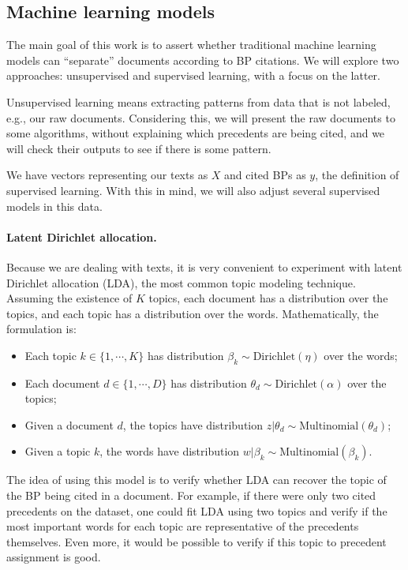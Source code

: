 \subsection{Machine learning models}
    \label{sec:models}

    The main goal of this work is to assert whether traditional machine learning models can ``separate'' documents according to BP citations. We will explore two approaches: unsupervised and supervised learning, with a focus on the latter.

    Unsupervised learning means extracting patterns from data that is not labeled, e.g., our raw documents. Considering this, we will present the raw documents to some algorithms, without explaining which precedents are being cited, and we will check their outputs to see if there is some pattern.

    We have vectors representing our texts as $X$ and cited BPs as $y$, the definition of supervised learning. With this in mind, we will also adjust several supervised models in this data.

    \paragraph{Latent Dirichlet allocation.} Because we are dealing with texts, it is very convenient to experiment with latent Dirichlet allocation (LDA), the most common topic modeling technique. Assuming the existence of $K$ topics, each document has a distribution over the topics, and each topic has a distribution over the words. Mathematically, the formulation is:

    \begin{itemize}
            \item Each topic $k \in \{1, \cdots, K\}$ has distribution $\beta_k \sim \text{Dirichlet}(\eta)$ over the words;
            \item Each document $d \in \{1, \cdots, D\}$ has distribution $\theta_d \sim \text{Dirichlet}(\alpha)$ over the topics;
            \item Given a document $d$, the topics have distribution $z | \theta_d \sim \text{Multinomial}(\theta_d)$;
            \item Given a topic $k$, the words have distribution $w | \beta_k \sim \text{Multinomial}(\beta_k)$.
    \end{itemize}

    The idea of using this model is to verify whether LDA can recover the topic of the BP being cited in a document. For example, if there were only two cited precedents on the dataset, one could fit LDA using two topics and verify if the most important words for each topic are representative of the precedents themselves. Even more, it would be possible to verify if this topic to precedent assignment is good.

